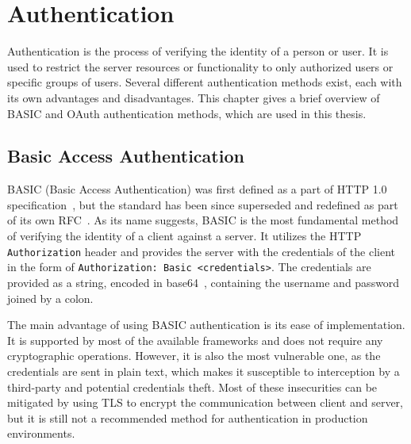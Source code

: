 
\chapter{Authentication}
\label{chapter:authentication}
Authentication is the process of verifying the identity of a person or user. It is used to restrict the server resources or functionality to only authorized users or specific groups of users. Several different authentication methods exist, each with its own advantages and disadvantages. This chapter gives a brief overview of BASIC and OAuth authentication methods, which are used in this thesis.

\section{Basic Access Authentication}
BASIC (Basic Access Authentication) was first defined as a part of HTTP 1.0 specification \cite{http1.0_w3}, but the standard has been since superseded and redefined as part of its own RFC \cite{basic_auth_rfc}. As its name suggests, BASIC is the most fundamental method of verifying the identity of a client against a server. It utilizes the HTTP \texttt{Authorization} header and provides the server with the credentials of the client in the form of \texttt{Authorization: Basic <credentials>}. The credentials are provided as a string, encoded in base64 \cite{base64_rfc}, containing the username and password joined by a colon.

The main advantage of using BASIC authentication is its ease of implementation. It is supported by most of the available frameworks and does not require any cryptographic operations. However, it is also the most vulnerable one, as the credentials are sent in plain text, which makes it susceptible to interception by a third-party and potential credentials theft. Most of these insecurities can be mitigated by using TLS to encrypt the communication between client and server, but it is still not a recommended method for authentication in production environments.

